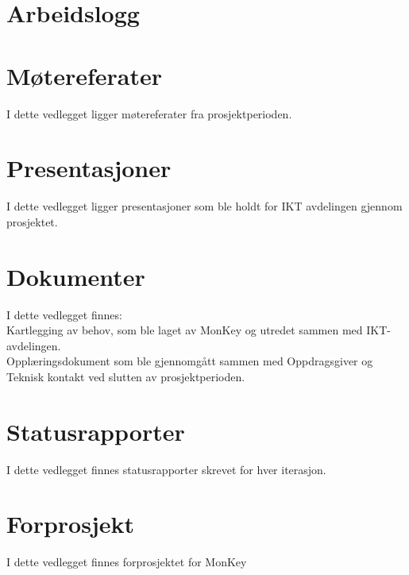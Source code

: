 \documentclass[a4paper,twoside,11pt,pdftex,norsk]{report}
\newcounter{includepdfpage}
\newcounter{currentpagecounter}
\newcommand{\addlabelstoallincludedpages}[1]{
   \refstepcounter{includepdfpage}
   \stepcounter{currentpagecounter}
	\appendix
   \label{#1.\thecurrentpagecounter}}
\newcommand{\modifiedincludepdf}[3]{
    \setcounter{currentpagecounter}{0}
    }
\begin{document}
\begin{appendices}
\chapter{Arbeidslogg}


\chapter{Møtereferater}
I dette vedlegget ligger møtereferater fra prosjektperioden.

\chapter{Presentasjoner}
I dette vedlegget ligger presentasjoner som ble holdt for IKT avdelingen gjennom prosjektet.




\chapter{Dokumenter}
I dette vedlegget finnes:\\ 
\indent Kartlegging av behov, som ble laget av MonKey og utredet sammen med IKT-avdelingen.\\
\indent Opplæringsdokument som ble gjennomgått sammen med Oppdragsgiver og Teknisk kontakt ved slutten av prosjektperioden.



\chapter{Statusrapporter}
I dette vedlegget finnes statusrapporter skrevet for hver iterasjon.
\modifiedincludepdf{-}{status1}{status/status1.pdf}
\modifiedincludepdf{-}{status2}{status/status2.pdf}








\chapter{Forprosjekt}
I dette vedlegget finnes forprosjektet for MonKey



\end{appendices}
\end{document}
